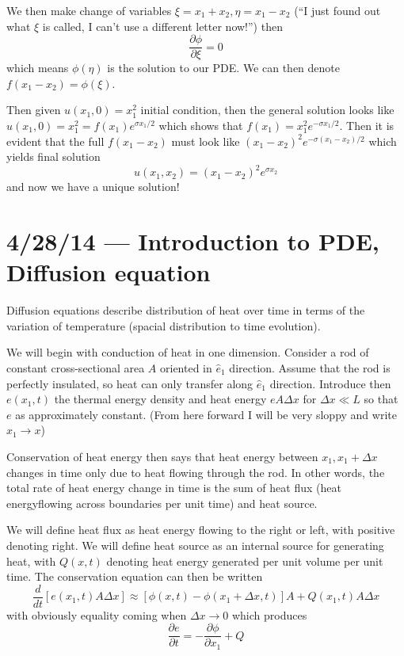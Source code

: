 \documentclass[10pt]{report}
\newcommand{\rd}[2]{\frac{d#1}{d#2}}
\newcommand{\pd}[2]{\frac{\partial #1}{\partial#2}}
\begin{document}
We then make change of variables $\xi = x_1 + x_2, \eta = x_1 - x_2$ (``I just found out what $\xi$ is called, I can't use a different letter now!'') then
\begin{equation}
    \pd{\phi}{\xi} = 0
\end{equation}
which means $\phi(\eta)$ is the solution to our PDE. We can then denote $f(x_1 - x_2) = \phi(\xi)$.

Then given $u(x_1,0) = x_1^2$ initial condition, then the general solution looks like $u(x_1,0) = x_1^2 = f(x_1)e^{\sigma x_1/2}$ which shows that $f(x_1) = x_1^2e^{-\sigma x_1/2}$. Then it is evident that the full $f(x_1 - x_2)$ must look like $(x_1 - x_2)^2e^{-\sigma(x_1 - x_2)/2}$ which yields final solution
\begin{equation}
    u(x_1, x_2) = (x_1 - x_2)^2e^{\sigma x_2}
\end{equation}
and now we have a unique solution!

\chapter{4/28/14 --- Introduction to PDE, Diffusion equation}

Diffusion equations describe distribution of heat over time in terms of the variation of temperature (spacial distribution to time evolution). 

We will begin with conduction of heat in one dimension. Consider a rod of constant cross-sectional area $A$ oriented in $\hat{e}_1$ direction. Assume that the rod is perfectly insulated, so heat can only transfer along $\hat{e}_1$ direction. Introduce then $e(x_1,t)$ the thermal energy density and heat energy $e A\Delta x$ for $\Delta x \ll L$ so that $e$ as approximately constant. (From here forward I will be very sloppy and write $x_1 \to x$)

Conservation of heat energy then says that heat energy between $x_1, x_1 + \Delta x$ changes in time only due to heat flowing through the rod. In other words, the total rate of heat energy change in time is the sum of heat flux (heat energyflowing across boundaries per unit time) and heat source. 

We will define heat flux as heat energy flowing to the right or left, with positive denoting right. We will define heat source as an internal source for generating heat, with $Q(x,t)$ denoting heat energy generated per unit volume per unit time. The conservation equation can then be written
{\small
\begin{equation}
    \rd{}{t}\left[ e(x_1,t)A\Delta x \right] \approx \left[\phi(x,t) - \phi(x_1 + \Delta x,t)\right]A + Q(x_1,t)A\Delta x
\end{equation}}
with obviously equality coming when $\Delta x \to 0$ which produces
\begin{equation}
    \pd{e}{t} = -\pd{\phi}{x_1} + Q
\end{equation}
\end{document}

